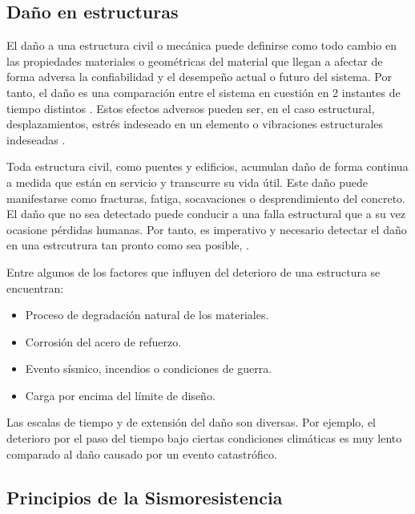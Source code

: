 

\subsection{Daño en estructuras}

El daño a una estructura civil o mecánica puede definirse como todo cambio en las propiedades materiales o geométricas del material que llegan a afectar de forma adversa la confiabilidad y el desempeño actual o futuro del sistema. Por tanto, el daño es una comparación entre el sistema en cuestión en 2 instantes de tiempo distintos \citep{farrar2007introduction}. Estos efectos adversos pueden ser, en el caso estructural, desplazamientos, estrés indeseado en un elemento o vibraciones estructurales indeseadas \citep{chen2018}.

Toda estructura civil, como puentes y edificios, acumulan daño de forma continua a medida que están en servicio y transcurre su vida útil. Este daño puede manifestarse como fracturas, fatiga, socavaciones o desprendimiento del concreto. El daño que no sea detectado puede conducir a una falla estructural que a su vez ocasione pérdidas humanas. Por tanto, es imperativo y necesario detectar el daño en una estrcutrura tan pronto como sea posible, \citep{chen2018}.

Entre algunos de los factores que influyen del deterioro de una estructura se encuentran:
    
        \begin{itemize}
            \item Proceso de degradación natural de los materiales.
            \item Corrosión del acero de refuerzo.
            \item Evento sísmico, incendios o condiciones de guerra.
            \item Carga por encima del límite de diseño.
        \end{itemize}
    
Las escalas de tiempo y de extensión del daño son diversas. Por ejemplo, el deterioro por el paso del tiempo bajo ciertas condiciones climáticas es muy lento comparado al daño causado por un evento catastrófico.

\subsection{Principios de la Sismoresistencia}

